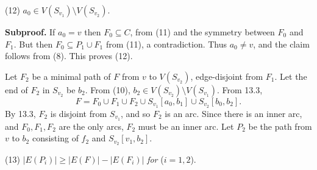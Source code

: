 \hspace*{12pt}(12) $a_0 \in V(S_{v_1}) \setminus V(S_{v_2})$.

\textbf{Subproof.} If $a_0 = v$ then $F_0 \subseteq C$, from (11) and the symmetry between $F_0$ and $F_1$. But then $F_0 \subseteq P_1 \cup F_1$ from (11), a contradiction. Thus $a_0 \ne v$, and the claim follows from (8). This proves (12).

Let $F_2$ be a minimal path of $F$ from $v$ to $V(S_{v_2})$, edge-disjoint from $F_1$. Let the end of $F_2$ in $S_{v_2}$ be $b_2$. From (10), $b_2 \in V(S_{v_2}) \setminus V(S_{v_1})$. From 13.3,
\begin{equation*}
F = F_0 \cup F_1 \cup F_2 \cup S_{v_1}[a_0, b_1] \cup S_{v_2}[b_0, b_2].
\end{equation*}
By 13.3, $F_2$ is disjoint from $S_{v_1}$, and so $F_2$ is an arc. Since there is an inner arc, and $F_0, F_1, F_2$ are the only arcs, $F_2$ must be an inner arc. Let $P_2$ be the path from $v$ to $b_2$ consisting of $f_2$ and $S_{v_2}[v_1, b_2]$.

\hspace*{12pt}(13) $|E(P_i)| \ge |E(F)| - |E(F_i)|$ \textit{for} ($i = 1, 2$).

